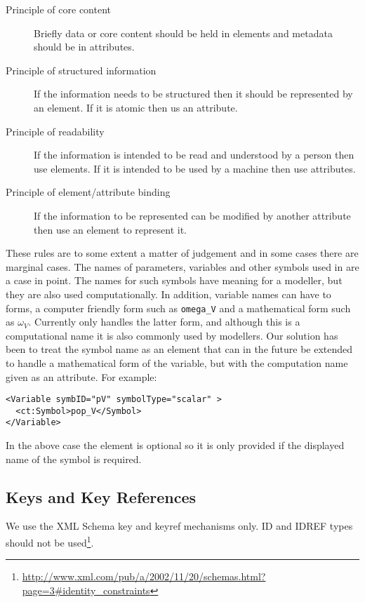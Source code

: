 \begin{description}
\item[Principle of core content] Briefly data or core content should
  be held in elements and metadata should be in attributes.
\item[Principle of structured information] If the information needs to
  be structured then it should be represented by an element. If it is
  atomic then us an attribute.
\item[Principle of readability] If the information is intended to be
  read and understood by a person then use elements. If it is intended
  to be used by a machine then use attributes.
\item[Principle of element/attribute binding] If the information to be
  represented can be modified by another attribute then use an element
  to represent it.
\end{description}

These rules are to some extent a matter of judgement and in some cases
there are marginal cases. The names of parameters, variables and other
symbols used in \pharmml are a case in point. The names for such
symbols have meaning for a modeller, but they are also used
computationally. In addition, variable names can have to forms, a
computer friendly form such as \texttt{omega\_V} and a mathematical
form such as $\omega_V$. Currently \pharmml only handles the latter
form, and although this is a computational name it is also commonly
used by modellers. Our solution has been to treat the symbol name as
an element that can in the future be extended to handle a mathematical
form of the variable, but with the computation name given as an
attribute. For example:

\lstset{language=XML}
\begin{lstlisting}
<Variable symbID="pV" symbolType="scalar" >
  <ct:Symbol>pop_V</Symbol>
</Variable>
\end{lstlisting}

In the above case the  element is optional so it is
only provided if the displayed name of the symbol is
required.

\subsection{Keys and Key References}

We use the XML Schema key and keyref mechanisms only. ID and IDREF
types should not be used\footnote{\url{http://www.xml.com/pub/a/2002/11/20/schemas.html?page=3\#identity_constraints}}.

